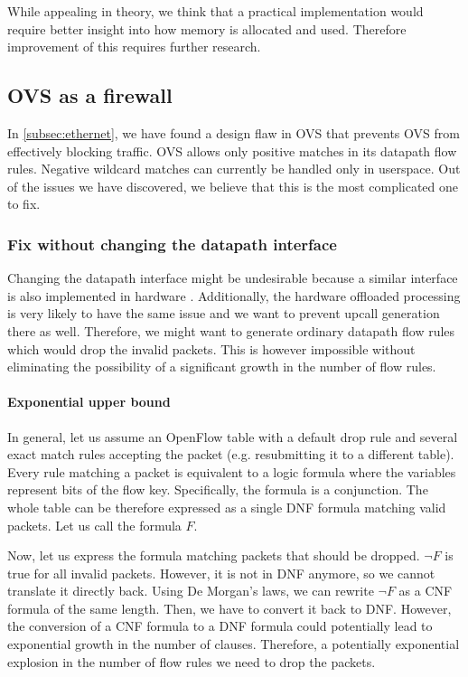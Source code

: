 While appealing in theory, we think that a practical implementation would require better insight into how memory is allocated and used. Therefore improvement of this requires further research.

\subsection{OVS as a firewall}

In \cref{subsec:ethernet}, we have found a design flaw in OVS that prevents OVS from effectively blocking traffic. OVS allows only positive matches in its datapath flow rules. Negative wildcard matches can currently be handled only in userspace. Out of the issues we have discovered, we believe that this is the most complicated one to fix. 

\subsubsection{Fix without changing the datapath interface}
Changing the datapath interface might be undesirable because a similar interface is also implemented in hardware \cite{OVSHW}. Additionally, the hardware offloaded processing is very likely to have the same issue and we want to prevent upcall generation there as well. Therefore, we might want to generate ordinary datapath flow rules which would drop the invalid packets. This is however impossible without eliminating the possibility of a significant growth in the number of flow rules.

\paragraph{Exponential upper bound}
In general, let us assume an OpenFlow table with a default drop rule and several exact match rules accepting the packet (e.g. resubmitting it to a different table). Every rule matching a packet is equivalent to a logic formula where the variables represent bits of the flow key. Specifically, the formula is a conjunction. The whole table can be therefore expressed as a single DNF formula matching valid packets. Let us call the formula $F$.

Now, let us express the formula matching packets that should be dropped. $\neg F$ is true for all invalid packets. However, it is not in DNF anymore, so we cannot translate it directly back. Using De Morgan's laws, we can rewrite $\neg F$ as a CNF formula of the same length. Then, we have to convert it back to DNF. However, the conversion of a CNF formula to a DNF formula could potentially lead to exponential growth in the number of clauses. Therefore, a potentially exponential explosion in the number of flow rules we need to drop the packets.

